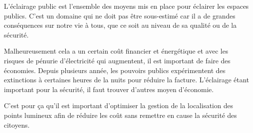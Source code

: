 L'\'eclairage public est l'ensemble des moyens mis en place pour \'eclairer les espaces publics. C'est un domaine qui ne doit pas \^etre sous-estim\'e car il a de grandes cons\'equences sur notre vie \`a tous, que ce soit au niveau de sa qualit\'e ou de la s\'ecurit\'e.\cite{projwebsite}


Malheureusement cela a un certain co\^ut financier et \'energ\'etique et avec les risques de p\'enurie d'\'electricit\'e qui augmentent, il est important de faire des \'economies. Depuis plusieurs ann\'ee, les pouvoirs publics exp\'erimentent des extinctions \`a certaines heures de la nuits pour r\'eduire la facture. L'\'eclairage \'etant important pour la s\'ecurit\'e, il faut trouver d'autres moyen d'\'economie.

C'est pour \c{c}a qu'il est important d'optimiser la gestion de la localisation des points lumineux afin de r\'eduire les co\^ut sans remettre en cause la s\'ecurit\'e des citoyens.